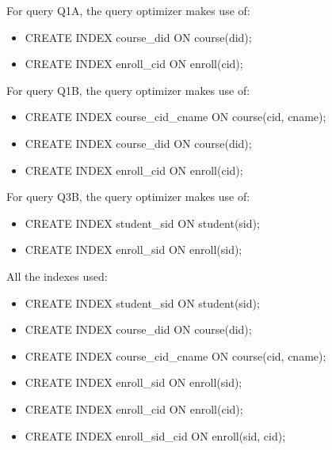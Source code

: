 \documentclass[10pt]{article}
\begin{document}
\begin{enumerate}
\begin{itemize}
\begin{enumerate}[1.]
					For query Q1A, the query optimizer makes use of:
					\begin{itemize}[*]
						\item CREATE INDEX course\_did ON course(did);
						\item CREATE INDEX enroll\_cid ON enroll(cid);
					\end{itemize}
					\bigskip
					
					For query Q1B, the query optimizer makes use of:
					\begin{itemize}[*]
						\item CREATE INDEX course\_cid\_cname ON course(cid, cname);
						\item CREATE INDEX course\_did ON course(did);
						\item CREATE INDEX enroll\_cid ON enroll(cid);
					\end{itemize}
					\bigskip
					
					For query Q3B, the query optimizer makes use of:
					\begin{itemize}[*]
						
						\item CREATE INDEX student\_sid ON student(sid);
						\item CREATE INDEX enroll\_sid ON enroll(sid);
					\end{itemize}
					\bigskip
					
					All the indexes used:
					\begin{itemize}[*]
						
						
						\item CREATE INDEX student\_sid ON student(sid);
						
						\item CREATE INDEX course\_did ON course(did);
						
						\item CREATE INDEX course\_cid\_cname ON course(cid, cname);
						
						\item CREATE INDEX enroll\_sid ON enroll(sid);
						
						\item CREATE INDEX enroll\_cid ON enroll(cid);
						
						\item CREATE INDEX enroll\_sid\_cid ON enroll(sid, cid);
					\end{itemize}
					
					
				\end{enumerate}
			

\end{itemize}
\end{enumerate}
\end{document}

